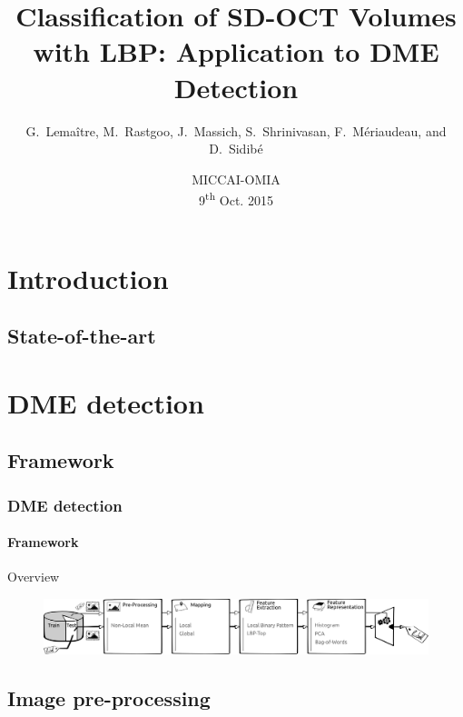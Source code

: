 \documentclass{beamer}
\title{\Large{Classification of SD-OCT Volumes with LBP: Application to DME Detection}}
\author{\scriptsize{G.~Lema\^itre, M.~Rastgoo, J.~Massich, S.~Shrinivasan, F.~M\'eriaudeau, and D.~Sidib\'e}}
\date{MICCAI-OMIA \\ 9\textsuperscript{th} Oct. 2015}
\institute{Universit\'e de Bourgogne \& Universitat de Girona}
\begin{document}
\begin{frame}
  \titlepage
\end{frame}

\begin{frame}
  \tableofcontents[sectionstyle=show,subsectionstyle=show,subsubsectionstyle=hide]
\end{frame}

\section{Introduction}

\subsection{State-of-the-art}

\section{DME detection}

\subsection{Framework}

\begin{frame}
  \frametitle{DME detection}
  \framesubtitle{Framework}
  \begin{block}{Overview}
    \begin{figure}
      \centering
      \includegraphics[width=1.\textwidth]{./images/ml.png}
    \end{figure}
  \end{block}
\end{frame}

\subsection{Image pre-processing}
\end{document}
